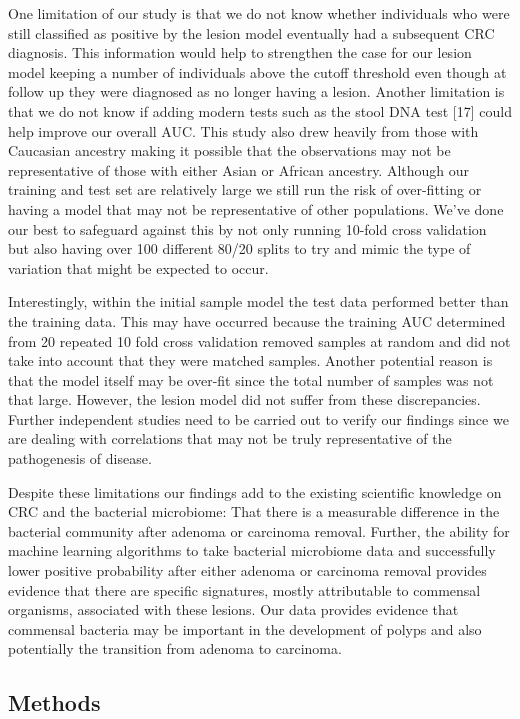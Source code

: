 \documentclass[12pt,]{article}
\begin{document}
One limitation of our study is that we do not know whether individuals
who were still classified as positive by the lesion model eventually had
a subsequent CRC diagnosis. This information would help to strengthen
the case for our lesion model keeping a number of individuals above the
cutoff threshold even though at follow up they were diagnosed as no
longer having a lesion. Another limitation is that we do not know if
adding modern tests such as the stool DNA test {[}17{]} could help
improve our overall AUC. This study also drew heavily from those with
Caucasian ancestry making it possible that the observations may not be
representative of those with either Asian or African ancestry. Although
our training and test set are relatively large we still run the risk of
over-fitting or having a model that may not be representative of other
populations. We've done our best to safeguard against this by not only
running 10-fold cross validation but also having over 100 different
80/20 splits to try and mimic the type of variation that might be
expected to occur.

Interestingly, within the initial sample model the test data performed
better than the training data. This may have occurred because the
training AUC determined from 20 repeated 10 fold cross validation
removed samples at random and did not take into account that they were
matched samples. Another potential reason is that the model itself may
be over-fit since the total number of samples was not that large.
However, the lesion model did not suffer from these discrepancies.
Further independent studies need to be carried out to verify our
findings since we are dealing with correlations that may not be truly
representative of the pathogenesis of disease.

Despite these limitations our findings add to the existing scientific
knowledge on CRC and the bacterial microbiome: That there is a
measurable difference in the bacterial community after adenoma or
carcinoma removal. Further, the ability for machine learning algorithms
to take bacterial microbiome data and successfully lower positive
probability after either adenoma or carcinoma removal provides evidence
that there are specific signatures, mostly attributable to commensal
organisms, associated with these lesions. Our data provides evidence
that commensal bacteria may be important in the development of polyps
and also potentially the transition from adenoma to carcinoma.

\newpage

\subsection{Methods}\label{methods}
\end{document}
